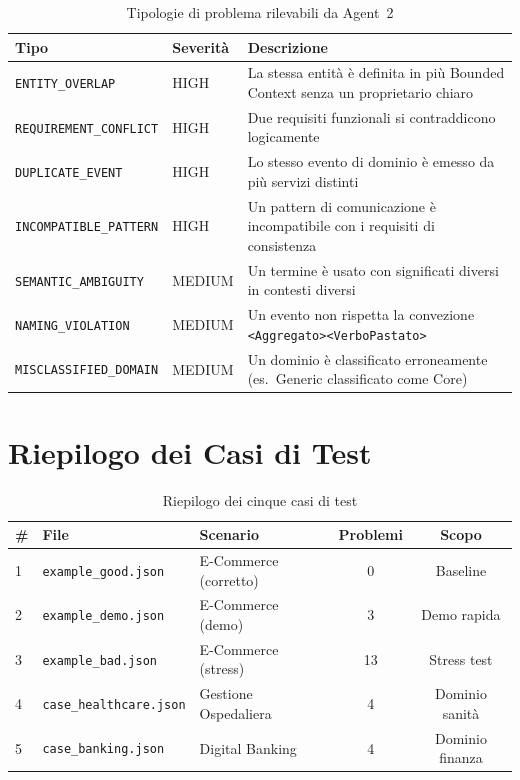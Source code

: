 \documentclass[12pt,a4paper]{report}
\begin{document}
\begin{table}[H]
\centering
\renewcommand{\arraystretch}{1.4}
\begin{tabularx}{\textwidth}{l l X}
\toprule
\textbf{Tipo} & \textbf{Severità} & \textbf{Descrizione} \\
\midrule
\texttt{ENTITY\_OVERLAP} & \textcolor{colorhigh}{HIGH} &
  La stessa entità è definita in più Bounded Context senza un proprietario chiaro \\
\texttt{REQUIREMENT\_CONFLICT} & \textcolor{colorhigh}{HIGH} &
  Due requisiti funzionali si contraddicono logicamente \\
\texttt{DUPLICATE\_EVENT} & \textcolor{colorhigh}{HIGH} &
  Lo stesso evento di dominio è emesso da più servizi distinti \\
\texttt{INCOMPATIBLE\_PATTERN} & \textcolor{colorhigh}{HIGH} &
  Un pattern di comunicazione è incompatibile con i requisiti di consistenza \\
\texttt{SEMANTIC\_AMBIGUITY} & \textcolor{colormedium}{MEDIUM} &
  Un termine è usato con significati diversi in contesti diversi \\
\texttt{NAMING\_VIOLATION} & \textcolor{colormedium}{MEDIUM} &
  Un evento non rispetta la convezione \texttt{<Aggregato><VerboPastato>} \\
\texttt{MISCLASSIFIED\_DOMAIN} & \textcolor{colormedium}{MEDIUM} &
  Un dominio è classificato erroneamente (es.\ Generic classificato come Core) \\
\bottomrule
\end{tabularx}
\caption{Tipologie di problema rilevabili da Agent~2}
\label{tab:issue-types}
\end{table}

\section{Riepilogo dei Casi di Test}

\begin{table}[H]
\centering
\renewcommand{\arraystretch}{1.4}
\begin{tabularx}{\textwidth}{l l X c c}
\toprule
\textbf{\#} & \textbf{File} & \textbf{Scenario} & \textbf{Problemi} & \textbf{Scopo} \\
\midrule
1 & \texttt{example\_good.json}    & E-Commerce (corretto) & 0  & Baseline \\
2 & \texttt{example\_demo.json}    & E-Commerce (demo)     & 3  & Demo rapida \\
3 & \texttt{example\_bad.json}     & E-Commerce (stress)   & 13 & Stress test \\
4 & \texttt{case\_healthcare.json} & Gestione Ospedaliera  & 4  & Dominio sanità \\
5 & \texttt{case\_banking.json}    & Digital Banking       & 4  & Dominio finanza \\
\bottomrule
\end{tabularx}
\caption{Riepilogo dei cinque casi di test}
\label{tab:test-summary}
\end{table}
\end{document}
